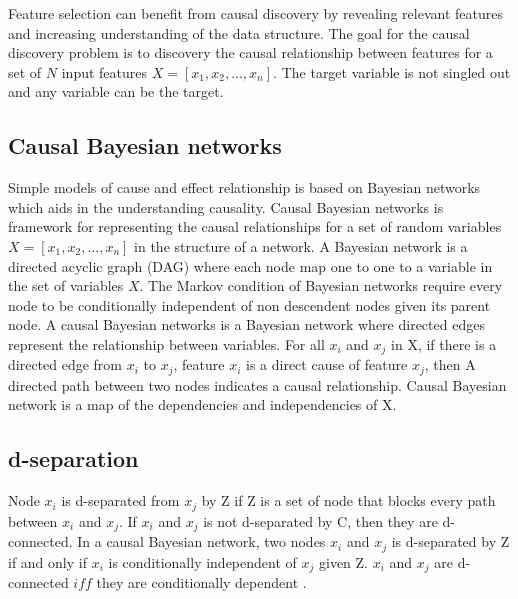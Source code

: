\indent Feature selection can benefit from causal discovery by revealing relevant features and increasing understanding of the data structure. The goal for the causal discovery problem is to discovery the causal relationship between features for a set of \(N\) input features \(X = [x_1, x_2, ..., x_n]\). The target variable is not singled out and any variable can be the target. 

\subsection{Causal Bayesian networks}
\indent Simple models of cause and effect relationship is based on Bayesian networks which aids in the understanding causality. Causal Bayesian networks is framework for representing the causal relationships for a set of random variables \(X = [x_1, x_2, ..., x_n]\) in the structure of a network. A Bayesian network is a directed acyclic graph (DAG) where each node map one to one to a variable in the set of variables \(X\). The Markov condition of Bayesian networks require every node to be conditionally independent of non descendent nodes given its parent node. A causal Bayesian networks is a Bayesian network where directed edges represent the relationship between variables. For all \(x_i\) and \(x_j\) in X, if there is a directed edge from \(x_i\) to \(x_j\), feature \(x_i\) is a direct cause of feature \(x_j\), then A directed path between two nodes indicates a causal relationship. Causal Bayesian network is a map of the dependencies and independencies of X. 

\subsection{d-separation}
Node \(x_i\) is d-separated from \(x_j\) by Z if Z is a set of node that blocks every path between \(x_i\) and \(x_j\). If \(x_i\) and \(x_j\) is not d-separated by C, then they are d-connected. In a causal Bayesian network, two nodes \(x_i\) and \(x_j\) is d-separated by Z if and only if \(x_i\) is conditionally independent of \(x_j\) given Z. \(x_i\) and \(x_j\) are d-connected \(iff\) they are conditionally dependent \cite{Clopinet}. 

